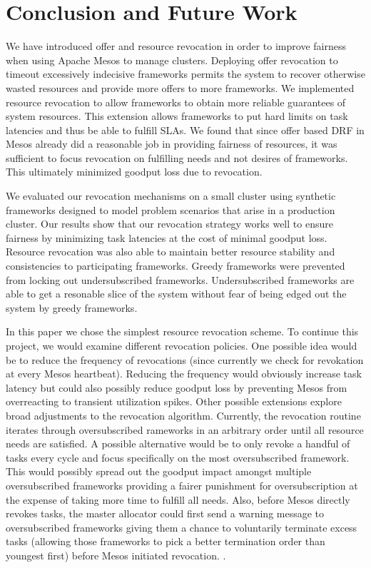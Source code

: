 \section{Conclusion and Future Work}
We have introduced offer and resource revocation in order to improve fairness when using Apache Mesos
to manage clusters. Deploying offer revocation to timeout excessively indecisive frameworks permits the
system to recover otherwise wasted resources and provide more offers to more frameworks. We implemented
resource revocation to allow frameworks to obtain more reliable guarantees of system resources. This
extension allows frameworks to put hard limits on task latencies and thus be able to fulfill SLAs. We
found that since offer based DRF in Mesos already did a reasonable job in providing fairness of
resources, it was sufficient to focus revocation on fulfilling needs and not desires of frameworks. This
ultimately minimized goodput loss due to revocation.

We evaluated our revocation mechanisms on a small cluster using synthetic frameworks designed to model
problem scenarios that arise in a production cluster. Our results show that our revocation strategy
works well to ensure fairness by minimizing task latencies at the cost of minimal goodput loss. Resource
revocation was also able to maintain better resource stability and consistencies to participating
frameworks. Greedy frameworks were prevented from locking out undersubscribed frameworks.
Undersubscribed frameworks are able to get a resonable slice of the system without fear of being edged
out the system by greedy frameworks.

In this paper we chose the simplest resource revocation scheme. To continue this project, we would
examine different revocation policies. One possible idea would be to reduce the frequency of revocations
(since currently we check for revokation at every Mesos heartbeat). Reducing the frequency would
obviously increase task latency but could also possibly reduce goodput loss by preventing Mesos from
overreacting to transient utilization spikes. Other possible extensions explore broad adjustments to the
revocation algorithm. Currently, the revocation routine iterates through oversubscribed rameworks in an
arbitrary order until all resource needs are satisfied. A possible alternative would be to only revoke a
handful of tasks every cycle and focus specifically on the most oversubscribed framework. This would
possibly spread out the goodput impact amongst multiple oversubscribed frameworks providing a fairer
punishment for oversubscription at the expense of taking more time to fulfill all needs. Also, before
Mesos directly revokes tasks, the master allocator could first send a warning message to oversubscribed
frameworks giving them a chance to voluntarily terminate excess tasks (allowing those frameworks to pick
a better termination order than youngest first) before Mesos initiated revocation.
\cite{mesos-paper, drf-paper, mesos-website}.
